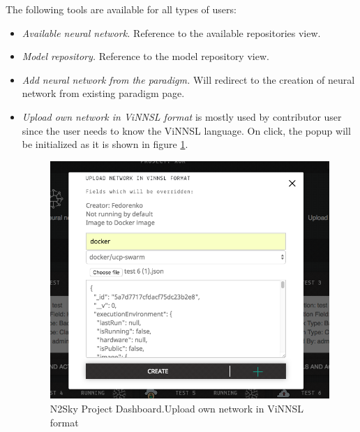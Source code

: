 The following tools are available for all types of users:
\begin{itemize}
\item \emph{Available neural network.} Reference to the available repositories view.  
\item \emph{Model repository.} Reference to the model repository view.
\item \emph{Add neural network from the paradigm.} Will redirect to the creation of neural network from existing paradigm page. 
\item \emph{Upload own network in ViNNSL format} is mostly used by contributor user since the user needs to know the ViNNSL language. On click, the popup will be initialized as it is shown in figure \ref{fig:upload_vinnsl_popup}. 

\begin{figure}[htbp]
\begin{center}
  \includegraphics[scale=0.5]{components/5/img/upload_vinnsl_popup.png}
  \caption{N2Sky Project Dashboard.Upload own network in ViNNSL format}
  \label{fig:upload_vinnsl_popup}
\end{center}
\end{figure}


\end{itemize}
